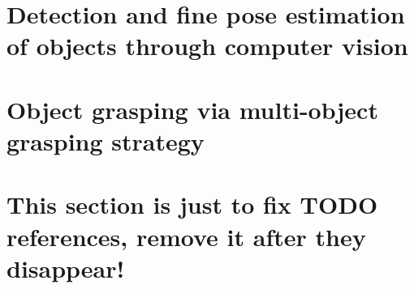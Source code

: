 \usepackage{amsmath}
\usepackage{adjustbox}
\usepackage[
backend=biber,
style=numeric, %
]{biblatex}

\newcommand{\vmiddle}[1]{\begin{tabular}{@{}c@{}} {#1} \end{tabular}}

\english
\tableofcontents
\listoffigures
\listoftables
\chapter{Detection and fine pose estimation of objects through computer vision}
\label{sec:vision}







\chapter{Object grasping via multi-object grasping strategy}





\chapter{This section is just to fix TODO references, remove it after they
disappear!} \label{sec:TODO}
\printbibliography

